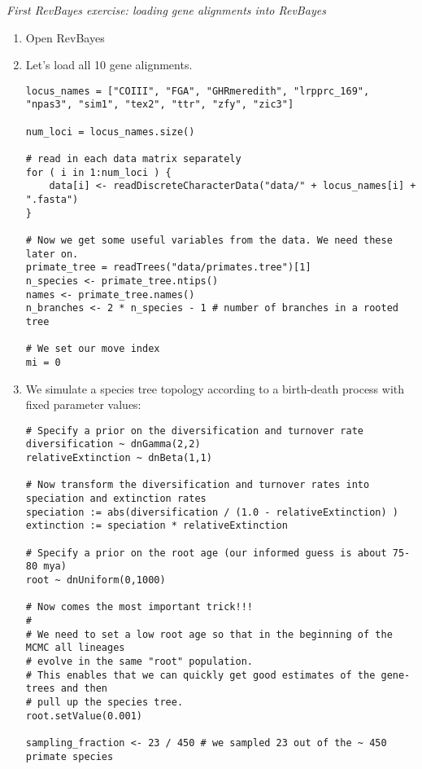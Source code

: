\begin{center}
\emph{First RevBayes exercise: loading gene alignments into RevBayes}
\end{center}
\begin{enumerate}
\item Open RevBayes
\item Let's load all 10 gene alignments.
{\tt \begin{snugshade*}
\begin{lstlisting}
locus_names = ["COIII", "FGA", "GHRmeredith", "lrpprc_169", "npas3", "sim1", "tex2", "ttr", "zfy", "zic3"]

num_loci = locus_names.size()

# read in each data matrix separately
for ( i in 1:num_loci ) {
    data[i] <- readDiscreteCharacterData("data/" + locus_names[i] + ".fasta")
}

# Now we get some useful variables from the data. We need these later on.
primate_tree = readTrees("data/primates.tree")[1]
n_species <- primate_tree.ntips()
names <- primate_tree.names()
n_branches <- 2 * n_species - 1 # number of branches in a rooted tree

# We set our move index
mi = 0
\end{lstlisting}
\end{snugshade*}}
\item We simulate a species tree topology according to a birth-death process with fixed parameter values:
{\tt \begin{snugshade*}
\begin{lstlisting}
# Specify a prior on the diversification and turnover rate
diversification ~ dnGamma(2,2)
relativeExtinction ~ dnBeta(1,1)

# Now transform the diversification and turnover rates into speciation and extinction rates
speciation := abs(diversification / (1.0 - relativeExtinction) )
extinction := speciation * relativeExtinction

# Specify a prior on the root age (our informed guess is about 75-80 mya)
root ~ dnUniform(0,1000)

# Now comes the most important trick!!!
# 
# We need to set a low root age so that in the beginning of the MCMC all lineages
# evolve in the same "root" population.
# This enables that we can quickly get good estimates of the gene-trees and then
# pull up the species tree.
root.setValue(0.001)

sampling_fraction <- 23 / 450 # we sampled 23 out of the ~ 450 primate species


\end{lstlisting}
\end{snugshade*}}
\end{enumerate}
